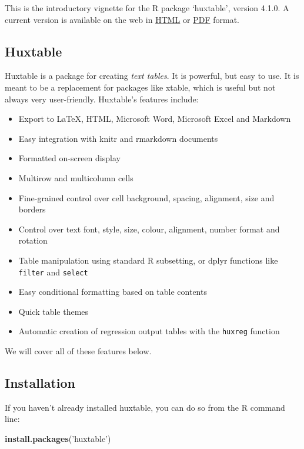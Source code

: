 \documentclass[]{article}
\newenvironment{Shaded}{\begin{snugshade}}{\end{snugshade}}
\newcommand{\KeywordTok}[1]{\textcolor[rgb]{0.13,0.29,0.53}{\textbf{#1}}}
\newcommand{\StringTok}[1]{\textcolor[rgb]{0.31,0.60,0.02}{#1}}
\newcommand{\NormalTok}[1]{#1}
\providecommand{\tightlist}{%
  \setlength{\itemsep}{0pt}\setlength{\parskip}{0pt}}
\begin{document}
This is the introductory vignette for the R package `huxtable', version
4.1.0. A current version is available on the web in
\href{https://hughjonesd.github.io/huxtable/huxtable.html}{HTML} or
\href{https://hughjonesd.github.io/huxtable/huxtable.pdf}{PDF} format.

\subsection{Huxtable}\label{huxtable}

Huxtable is a package for creating \emph{text tables}. It is powerful,
but easy to use. It is meant to be a replacement for packages like
xtable, which is useful but not always very user-friendly. Huxtable's
features include:

\begin{itemize}
\tightlist
\item
  Export to LaTeX, HTML, Microsoft Word, Microsoft Excel and Markdown
\item
  Easy integration with knitr and rmarkdown documents
\item
  Formatted on-screen display
\item
  Multirow and multicolumn cells
\item
  Fine-grained control over cell background, spacing, alignment, size
  and borders
\item
  Control over text font, style, size, colour, alignment, number format
  and rotation
\item
  Table manipulation using standard R subsetting, or dplyr functions
  like \texttt{filter} and \texttt{select}
\item
  Easy conditional formatting based on table contents
\item
  Quick table themes
\item
  Automatic creation of regression output tables with the
  \texttt{huxreg} function
\end{itemize}

We will cover all of these features below.

\subsection{Installation}\label{installation}

If you haven't already installed huxtable, you can do so from the R
command line:

\begin{Shaded}
\begin{Highlighting}[]
\KeywordTok{install.packages}\NormalTok{(}\StringTok{'huxtable'}\NormalTok{)}
\end{Highlighting}
\end{Shaded}
\end{document}
